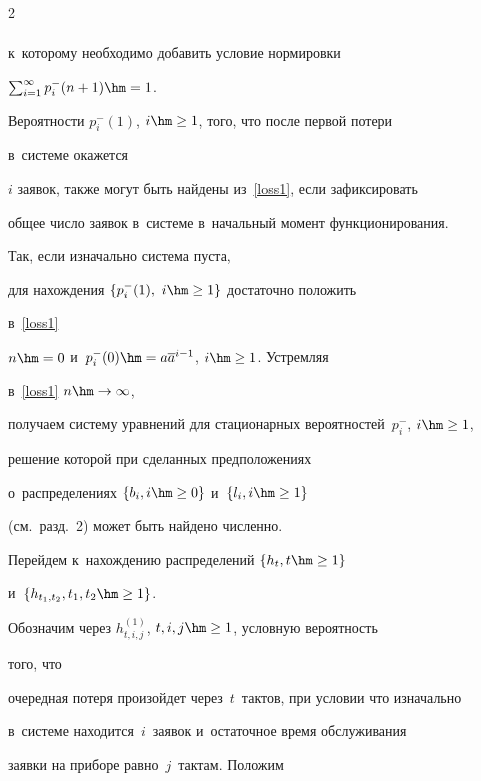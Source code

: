 \begin{multicols}{2}
\begin{multline}
\end{multline}





\noindent к~которому необходимо добавить условие нормировки 


$\sum\nolimits_{i=1}^{\infty} p_i^-(n+1)\hm=1$.


Вероятности $p_i^-(1)$, $i \hm\ge 1$, того, что после первой потери 


в~системе окажется


$i$ заявок, также могут быть найдены из~\eqref{loss1}, если зафиксировать


общее число заявок в~системе в~начальный момент функционирования.


Так, если изначально система пуста,


для нахождения $\{ p_i^-(1), \ i \hm\ge 1\}$ достаточно положить 


в~\eqref{loss1}


$n\hm=0$ и~$p_i^-(0)\hm=a \overline{a}^{i-1}$, $i \hm\ge 1$. Устремляя 


в~\eqref{loss1} $n \hm\rightarrow \infty$,


получаем систему уравнений для стационарных вероятностей~$p_i^-$, $i 


\hm\ge 1$,


решение которой при сделанных предположениях


о~распределениях $\{ b_i, i \hm\ge 0\}$ и~$\{ l_i, i \hm\ge 1\}$


(см.\ разд.~2) может быть найдено чис\-лен\-но.





Перейдем к~нахождению распределений $\{h_{t},\linebreak t \hm\ge 1\}$ 


и~$\{h_{t_1,t_2}, t_1,t_2 \hm\ge 1\}$.


Обозначим через $h^{(1)}_{t,i,j}$, $t,i,j \hm\ge 1$, условную вероятность 


того, что


очередная потеря произойдет через~$t$~тактов, при условии что изначально


в~системе находится~$i$~заявок и~остаточное время обслуживания


заявки на приборе равно~$j$~тактам. Положим 





\noindent


$$



\end{multicols}

